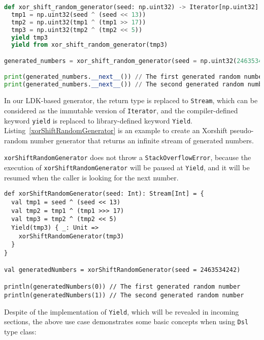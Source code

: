 \begin{lstlisting}[language=Python,style=Python3,caption={An Xorshift pseudo-random number generator in Python 3.5+},label={xorShiftRandomGenerator-Python}]
def xor_shift_random_generator(seed: np.uint32) -> Iterator[np.uint32]:
  tmp1 = np.uint32(seed ^ (seed << 13))
  tmp2 = np.uint32(tmp1 ^ (tmp1 >> 17))
  tmp3 = np.uint32(tmp2 ^ (tmp2 << 5))
  yield tmp3
  yield from xor_shift_random_generator(tmp3)

generated_numbers = xor_shift_random_generator(seed = np.uint32(2463534242))

print(generated_numbers.__next__()) // The first generated random number
print(generated_numbers.__next__()) // The second generated random number
\end{lstlisting}

In our LDK-based generator, the return type is replaced to \lstinline{Stream}, which can be considered as the immutable version of \lstinline{Iterator}, and the compiler-defined keyword \lstinline{yield} is replaced to library-defined keyword \lstinline{Yield}. Listing~\ref{xorShiftRandomGenerator} is an example to create an Xorshift \cite{marsaglia2003xorshift} pseudo-random number generator that returns an infinite stream of generated numbers. 

\lstinline{xorShiftRandomGenerator} does not throw a \lstinline{StackOverflowError}, because the execution of \lstinline{xorShiftRandomGenerator} will be paused at \lstinline{Yield}, and it will be resumed when the caller is looking for the next number.

\begin{lstlisting}[caption={An Xorshift pseudo-random number generator with the help of the LDK \lstinline{Yield}},label={xorShiftRandomGenerator}]
def xorShiftRandomGenerator(seed: Int): Stream[Int] = {
  val tmp1 = seed ^ (seed << 13)
  val tmp2 = tmp1 ^ (tmp1 >>> 17)
  val tmp3 = tmp2 ^ (tmp2 << 5)
  Yield(tmp3) { _: Unit =>
    xorShiftRandomGenerator(tmp3)
  }
}

val generatedNumbers = xorShiftRandomGenerator(seed = 2463534242)

println(generatedNumbers(0)) // The first generated random number
println(generatedNumbers(1)) // The second generated random number
\end{lstlisting}

Despite of the implementation of \lstinline{Yield}, which will be revealed in incoming sections, the above use case demonstrates some basic concepts when using \lstinline{Dsl} type class:

